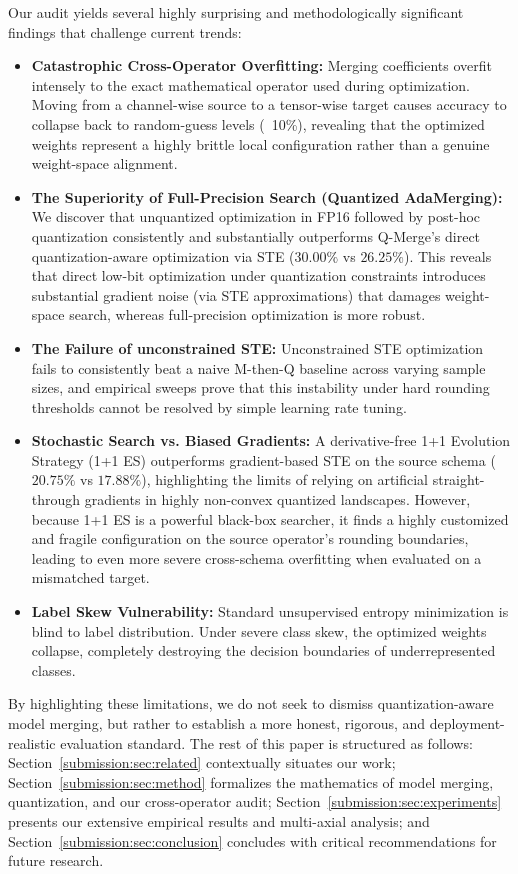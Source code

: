 Our audit yields several highly surprising and methodologically significant findings that challenge current trends:
\begin{itemize}
    \item \textbf{Catastrophic Cross-Operator Overfitting:} Merging coefficients overfit intensely to the exact mathematical operator used during optimization. Moving from a channel-wise source to a tensor-wise target causes accuracy to collapse back to random-guess levels (~10\%), revealing that the optimized weights represent a highly brittle local configuration rather than a genuine weight-space alignment.
    \item \textbf{The Superiority of Full-Precision Search (Quantized AdaMerging):} We discover that unquantized optimization in FP16 followed by post-hoc quantization consistently and substantially outperforms Q-Merge's direct quantization-aware optimization via STE ($30.00\%$ vs $26.25\%$). This reveals that direct low-bit optimization under quantization constraints introduces substantial gradient noise (via STE approximations) that damages weight-space search, whereas full-precision optimization is more robust.
    \item \textbf{The Failure of unconstrained STE:} Unconstrained STE optimization fails to consistently beat a naive M-then-Q baseline across varying sample sizes, and empirical sweeps prove that this instability under hard rounding thresholds cannot be resolved by simple learning rate tuning.
    \item \textbf{Stochastic Search vs. Biased Gradients:} A derivative-free 1+1 Evolution Strategy (1+1 ES) outperforms gradient-based STE on the source schema ($20.75\%$ vs $17.88\%$), highlighting the limits of relying on artificial straight-through gradients in highly non-convex quantized landscapes. However, because 1+1 ES is a powerful black-box searcher, it finds a highly customized and fragile configuration on the source operator's rounding boundaries, leading to even more severe cross-schema overfitting when evaluated on a mismatched target.
    \item \textbf{Label Skew Vulnerability:} Standard unsupervised entropy minimization is blind to label distribution. Under severe class skew, the optimized weights collapse, completely destroying the decision boundaries of underrepresented classes.
\end{itemize}

By highlighting these limitations, we do not seek to dismiss quantization-aware model merging, but rather to establish a more honest, rigorous, and deployment-realistic evaluation standard. The rest of this paper is structured as follows: Section~\ref{submission:sec:related} contextually situates our work; Section~\ref{submission:sec:method} formalizes the mathematics of model merging, quantization, and our cross-operator audit; Section~\ref{submission:sec:experiments} presents our extensive empirical results and multi-axial analysis; and Section~\ref{submission:sec:conclusion} concludes with critical recommendations for future research.
